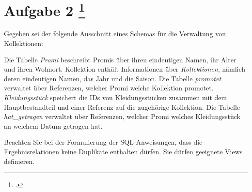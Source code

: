 \documentclass{lehramt-informatik-aufgabe}
\begin{document}
\section{Aufgabe 2
\footcite{examen:66116:2020:03}}

Gegeben sei der folgende Ausschnitt eines Schemas für die Verwaltung von
Kollektionen:








Die Tabelle \emph{Promi} beschreibt Promis über ihren eindeutigen Namen,
ihr Alter und ihren Wohnort. Kollektion enthält Informationen über
\emph{Kollektionen}, nämlich deren eindeutigen Namen, das Jahr und die
Saison. Die Tabelle \emph{promotet} verwaltet über Referenzen, welcher
Promi welche Kollektion promotet. \emph{Kleidungsstück} speichert die
IDs von Kleidungsstücken zusammen mit dem Hauptbestandteil und einer
Referenz auf die zugehörige Kollektion. Die Tabelle \emph{hat\_getragen}
verwaltet über Referenzen, welcher Promi welches Kleidungsstück an
welchem Datum getragen hat.

\bigskip

Beachten Sie bei der Formulierung der SQL-Anweisungen, dass die
Ergebnisrelationen keine Duplikate enthalten dürfen. Sie dürfen
geeignete Views definieren.
\end{document}
